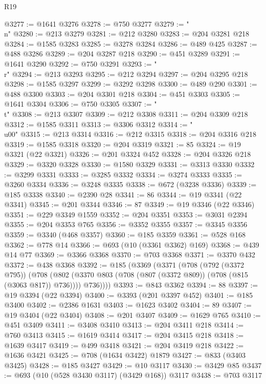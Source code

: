 \begin{lexlean}{R19}
\begin{coremodule}
{{{{{{{{{{{@3277 := @1641 @3276
@3278 := @750 @3277
@3279 := "\\n"
@3280 := @213 @3279
@3281 := @212 @3280
@3283 := @204 @3281 @218
@3284 := @1585 @3283
@3285 := @3278 @3284
@3286 := @489 @425
@3287 := @488 @3286
@3289 := @204 @3287 @218
@3290 := @451 @3289
@3291 := @1641 @3290
@3292 := @750 @3291
@3293 := "\\r"
@3294 := @213 @3293
@3295 := @212 @3294
@3297 := @204 @3295 @218
@3298 := @1585 @3297
@3299 := @3292 @3298
@3300 := @489 @290
@3301 := @488 @3300
@3303 := @204 @3301 @218
@3304 := @451 @3303
@3305 := @1641 @3304
@3306 := @750 @3305
@3307 := "\\t"
@3308 := @213 @3307
@3309 := @212 @3308
@3311 := @204 @3309 @218
@3312 := @1585 @3311
@3313 := @3306 @3312
@3314 := "\\u00"
@3315 := @213 @3314
@3316 := @212 @3315
@3318 := @204 @3316 @218
@3319 := @1585 @3318
@3320 := @204 @3319
@3321 := 85
@3324 := @19 @3321 (@22 @3321)
@3326 := @201 @3324 @452
@3328 := @204 @3326 @218
@3329 := @3320 @3328
@3330 := @1580 @3329
@3331 := @3313 @3330
@3332 := @3299 @3331
@3333 := @3285 @3332
@3334 := @3274 @3333
@3335 := @3260 @3334
@3336 := @3248 @3335
@3338 := @672 (@3238 @3336)
@3339 := @185 @3338
@3340 := @2390 @28
@3341 := 86
@3344 := @19 @3341 (@22 @3341)
@3345 := @201 @3344
@3346 := 87
@3349 := @19 @3346 (@22 @3346)
@3351 := @229 @3349 @1559
@3352 := @204 @3351
@3353 := @3031 @2394
@3355 := @204 @3353 @765
@3356 := @3352 @3355
@3357 := @3345 @3356
@3359 := @3340 (@468 @3357)
@3360 := @185 @3359
@3361 := @528 @168
@3362 := @778 @14
@3366 := @693 (@10 (@3361 @3362) @169)
@3368 := @439 @14 @77
@3369 := @3366 @3368
@3370 := @703 @3368
@3371 := @3370 @432
@3372 := @438 @3368
@3392 := @185
    (@3369
      (@3371
        (@708
          (@792 (@3372 @795))
          (@708
            (@802 (@3370 @803 (@708 (@807 (@3372 @809)) (@708 (@815 (@3063 @817)) @736))))
            @736))))
@3393 := @843 @3362
@3394 := 88
@3397 := @19 @3394 (@22 @3394)
@3400 := @3393 (@201 @3397 @452)
@3401 := @185 @3400
@3402 := @2386 @1631
@3403 := @1623 @3402
@3404 := 89
@3407 := @19 @3404 (@22 @3404)
@3408 := @201 @3407
@3409 := @1629 @765
@3410 := @451 @3409
@3411 := @3408 @3410
@3413 := @204 @3411 @218
@3414 := @760 @3413
@3415 := @1619 @3414
@3417 := @204 @3415 @218
@3418 := @1639 @3417
@3419 := @499 @3418
@3421 := @204 @3419 @218
@3422 := @1636 @3421
@3425 := @708 (@1634 @3422) @1879
@3427 := @833 (@3403 @3425)
@3428 := @185 @3427
@3429 := @10 @3117
@3430 := @3429 @85
@3437 := @693 (@10 (@528 @3430 @3117) (@3429 @168)) @3117
@3438 := @703 @3117
}}}}}}}}}}}
\end{coremodule}
\end{lexlean}
